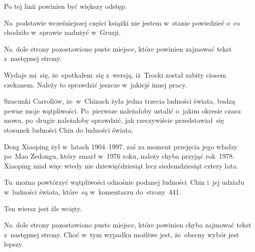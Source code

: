 \documentclass[a4paper,11pt]{article}
\begin{document}
\vspace{\spaceFour}


\start {} Po tej linii powinien być większy odstęp.

\vspace{\spaceFour}


\start {} Na~podstawie wcześniejszej części książki nie
jestem w~stanie powiedzieć o~co chodziło w~sprawie nadużyć w~Gruzji.

\vspace{\spaceFour}


\start {} Na~dole strony pozostawiono puste miejsce, które
powinien zajmować tekst z~następnej strony.

\vspace{\spaceFour}


\start {} Wydaje mi~się, że~spotkałem~się z~wersją,
iż~Trocki został zabity ciosem czekanem. Należy to sprawdzić jeszcze
w~jakiejś innej pracy.

\vspace{\spaceFour}


\start {} Szacunki Carrollów, że~w~Chinach żyła jedna
trzecia ludności świata, budzą pewne moje wątpliwości. Po~pierwsze
należałoby ustalić o~jakim okresie czasu mowa, po~drugie należałoby
sprawdzić, jak rzeczywiście przedstawiał~się stosunek ludności Chin do
ludności świata.

\vspace{\spaceFour}


\start {} Deng Xiaoping żył w~latach 1904--1997, zaś za
moment przejęcia jego władzy po~Mao Zedongu, który zmarł w~1976 roku,
należy chyba przyjąć rok~1978. Xiaoping miał więc wtedy nie
dziewięćdziesiąt lecz siedemdziesiąt cztery lata.

\vspace{\spaceFour}


\start {} Tu~można powtórzyć wątpliwości odnośnie podanej
ludności~Chin i~jej udziału w~ludności świata, które~są w~komentarzu
do~strony~441.

\vspace{\spaceFour}


\start {} Ten wiersz jest źle wcięty.

\vspace{\spaceFour}


\start {} Na~dole strony pozostawiono puste miejsce, które
powinien chyba zajmować tekst z~następnej strony. Choć w~tym wypadku
możliwe jest, że~obecny wybór jest lepszy.
\end{document}
